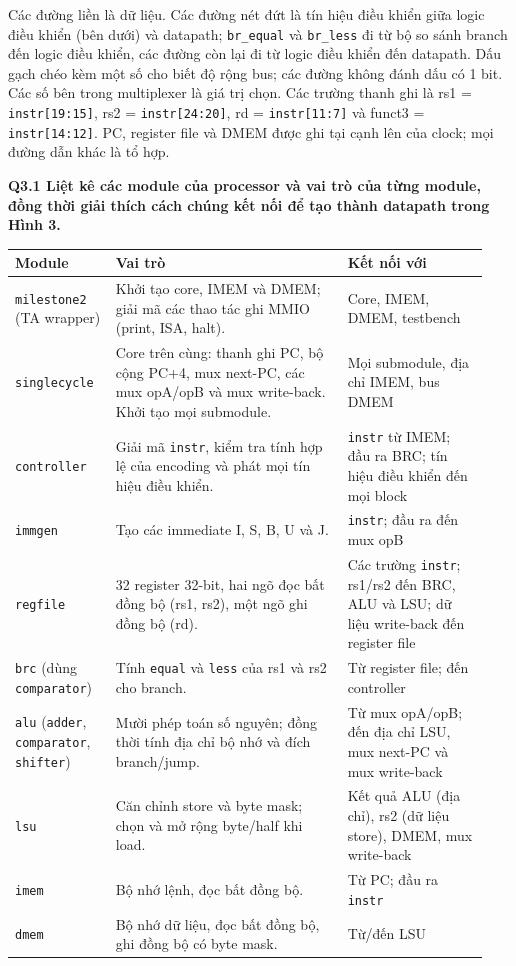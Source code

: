 \documentclass[10pt,a4paper]{article}
\newcommand{\code}[1]{\texttt{#1}}
\begin{document}
{\small Các đường liền là dữ liệu. Các đường nét đứt là tín hiệu điều khiển giữa
logic điều khiển (bên dưới) và datapath; \code{br\_equal} và \code{br\_less}
đi từ bộ so sánh branch đến logic điều khiển, các đường còn lại đi từ
logic điều khiển đến datapath. Dấu gạch chéo kèm một số cho biết độ rộng bus; các đường không đánh dấu có
1 bit. Các số bên trong multiplexer là giá trị chọn. Các trường thanh ghi
là rs1 = \code{instr[19:15]}, rs2 = \code{instr[24:20]},
rd = \code{instr[11:7]} và funct3 = \code{instr[14:12]}. PC,
register file và DMEM được ghi tại cạnh lên của clock; mọi đường dẫn khác là
tổ hợp.\par}

\textbf{Q3.1 Liệt kê các module của processor và vai trò của từng module,
đồng thời giải thích cách chúng kết nối để tạo thành datapath trong Hình 3.}

\begin{tabular}{@{}p{0.2\linewidth}p{0.46\linewidth}p{0.28\linewidth}@{}}
\toprule
\textbf{Module} & \textbf{Vai trò} & \textbf{Kết nối với} \\
\midrule
\code{milestone2} (TA wrapper) & Khởi tạo core, IMEM và DMEM; giải mã các thao tác ghi MMIO (print, ISA, halt). & Core, IMEM, DMEM, testbench \\
\code{singlecycle} & Core trên cùng: thanh ghi PC, bộ cộng PC+4, mux next-PC, các mux opA/opB và mux write-back. Khởi tạo mọi submodule. & Mọi submodule, địa chỉ IMEM, bus DMEM \\
\code{controller} & Giải mã \code{instr}, kiểm tra tính hợp lệ của encoding và phát mọi tín hiệu điều khiển. & \code{instr} từ IMEM; đầu ra BRC; tín hiệu điều khiển đến mọi block \\
\code{immgen} & Tạo các immediate I, S, B, U và J. & \code{instr}; đầu ra đến mux opB \\
\code{regfile} & 32 register 32-bit, hai ngõ đọc bất đồng bộ (rs1, rs2), một ngõ ghi đồng bộ (rd). & Các trường \code{instr}; rs1/rs2 đến BRC, ALU và LSU; dữ liệu write-back đến register file \\
\code{brc} (dùng \code{comparator}) & Tính \code{equal} và \code{less} của rs1 và rs2 cho branch. & Từ register file; đến controller \\
\code{alu} (\code{adder}, \code{comparator}, \code{shifter}) & Mười phép toán số nguyên; đồng thời tính địa chỉ bộ nhớ và đích branch/jump. & Từ mux opA/opB; đến địa chỉ LSU, mux next-PC và mux write-back \\
\code{lsu} & Căn chỉnh store và byte mask; chọn và mở rộng byte/half khi load. & Kết quả ALU (địa chỉ), rs2 (dữ liệu store), DMEM, mux write-back \\
\code{imem} & Bộ nhớ lệnh, đọc bất đồng bộ. & Từ PC; đầu ra \code{instr} \\
\code{dmem} & Bộ nhớ dữ liệu, đọc bất đồng bộ, ghi đồng bộ có byte mask. & Từ/đến LSU \\
\bottomrule
\end{tabular}
\end{document}
